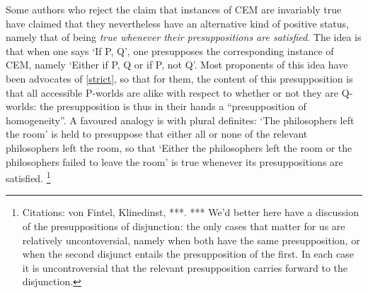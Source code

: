 \documentclass[If.tex]{subfiles}
\begin{document}
Some authors who reject the claim that instances of CEM are invariably true have claimed that they nevertheless have an alternative kind of positive status, namely that of being \emph{true whenever their presuppositions are satisfied}.  The idea is that when one says ‘If P, Q’, one presupposes the corresponding instance of CEM, namely ‘Either if P, Q or if P, not Q’.  Most proponents of this idea have been advocates of \ref{strict}, so that for them, the content of this presupposition is that all accessible P-worlds are alike with respect to whether or not they are Q-worlds: the presupposition is thus in their hands a “presupposition of homogeneity”.  A favoured analogy is with plural definites: ‘The philosophers left the room’ is held to presuppose that either all or none of the relevant philosophers left the room, so that ‘Either the philosophers left the room or the philosophers failed to leave the room’ is true whenever its presuppositions are satisfied.%
\footnote{Citations: von Fintel, Klinedinst, ***.  *** We'd better here have a discussion of the presuppositions of disjunction: the only cases that matter for us are relatively uncontoversial, namely when both have the same presupposition, or when the second disjunct entails the presupposition of the first.  In each case it is uncontroversial that the relevant presupposition carries forward to the disjunction.  }
\end{document}

